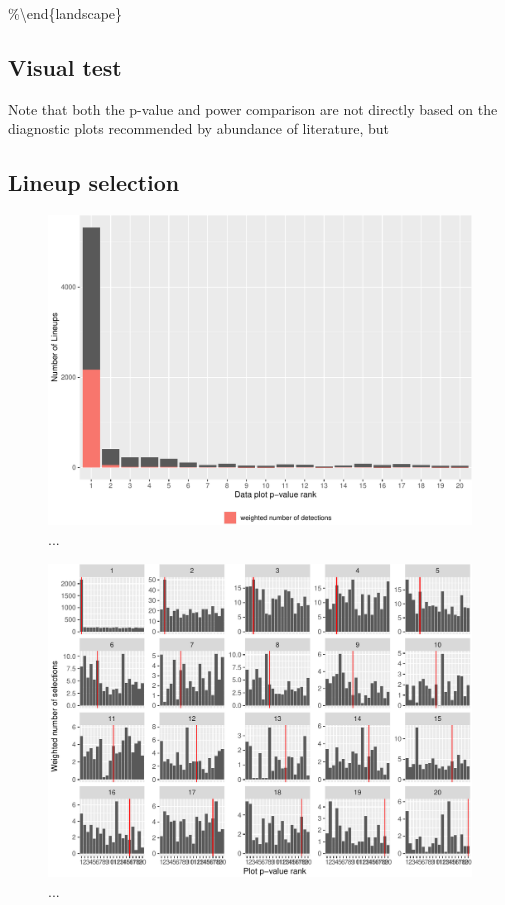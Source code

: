 \documentclass[]{interact}
\theoremstyle{plain}%
\theoremstyle{definition}
\theoremstyle{remark}
\begin{document}
\%\textbackslash end\{landscape\}

\hypertarget{visual-test}{%
\subsection{Visual test}\label{visual-test}}

Note that both the p-value and power comparison are not directly based
on the diagnostic plots recommended by abundance of literature, but

\hypertarget{lineup-selection}{%
\subsection{Lineup selection}\label{lineup-selection}}

\begin{figure}

{\centering \includegraphics[width=1\linewidth]{paper_comparison_files/figure-latex/dataplotsel-1} 

}

\caption{...}\label{fig:dataplotsel}
\end{figure}

\begin{figure}

{\centering \includegraphics[width=1\linewidth]{paper_comparison_files/figure-latex/dadtaplotselfacet-1} 

}

\caption{...}\label{fig:dadtaplotselfacet}
\end{figure}

\pagebreak



\end{document}
